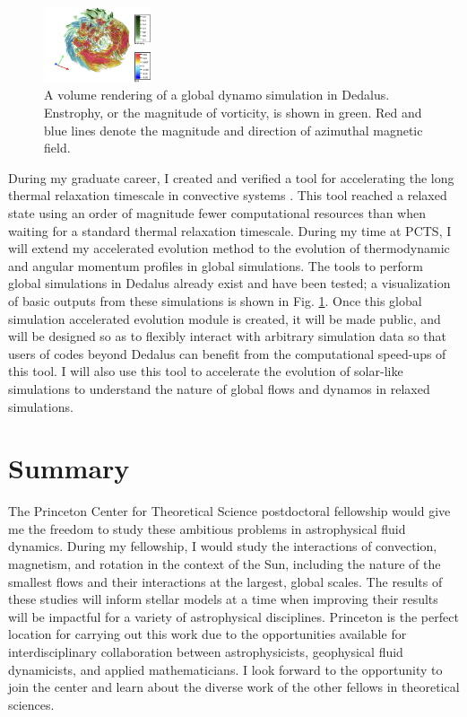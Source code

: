 \documentclass[11pt, preprint]{aastex}
\begin{document}
\begin{figure}
	\begin{center}
	\vspace{-10pt}
    \includegraphics[width=0.28\textwidth]{./figs/mdwarf.png}
	\vspace{-16pt}
	\end{center}
    \caption{A volume rendering of a global dynamo simulation in Dedalus.
	Enstrophy, or the magnitude of vorticity, is shown in green.
	Red and blue lines denote the magnitude and direction of azimuthal magnetic field.
	\label{fig:mdwarf} }
\end{figure}
During my graduate career, I created and verified a tool for accelerating the long thermal relaxation timescale in convective systems \citep{anders&all2018}.
This tool reached a relaxed state using an order of magnitude fewer computational resources than when waiting for a standard thermal relaxation timescale.
During my time at PCTS, I will extend my accelerated evolution method to the evolution of thermodynamic and angular momentum profiles in global simulations.
The tools to perform global simulations in Dedalus already exist \citep{lecoanet&all2018} and have been tested; a visualization of basic outputs from these simulations is shown in Fig. \ref{fig:mdwarf}.
Once this global simulation accelerated evolution module is created, it will be made public, and will be designed so as to flexibly interact with arbitrary simulation data so that users of codes beyond Dedalus can benefit from the computational speed-ups of this tool.
I will also use this tool to accelerate the evolution of solar-like simulations to understand the nature of global flows and dynamos in relaxed simulations.

\vspace{-0.8cm}
\section{Summary}
\vspace{-0.3cm}
The Princeton Center for Theoretical Science postdoctoral fellowship would give me the freedom to study these ambitious problems in astrophysical fluid dynamics.
During my fellowship, I would study the interactions of convection, magnetism, and rotation in the context of the Sun, including the nature of the smallest flows and their interactions at the largest, global scales.
The results of these studies will inform stellar models  at a time when improving their results will be impactful for a variety of astrophysical disciplines.
Princeton is the perfect location for carrying out this work due to the opportunities available for interdisciplinary collaboration between astrophysicists, geophysical fluid dynamicists, and applied mathematicians.
I look forward to the opportunity to join the center and learn about the diverse work of the other fellows in theoretical sciences.

\newpage


\end{document}
